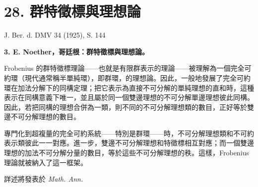\documentclass[11pt]{article}
\begin{document}
\section*{28. 群特徵標與理想論}

\begin{center}
J. Ber. d. DMV 34 (1925), S. 144
\end{center}

\textbf{3. E. Noether，哥廷根：群特徵標與理想論。}

Frobenius 的群特徵標理論——也就是有限群表示的理論——被理解為一個完全可約環（現代通常稱半單純環），即群環，的理想論。因此，一般地發展了完全可約環在加法分解下的同構定理；把它表示為直接不可分解的單純理想的直和時，這種表示在同構意義下唯一，並且屬於同一個雙邊理想的不可分解單邊理想彼此同構。因此，若把同構的理想合併為一類，則不同的不可分解理想類的數目，正好等於雙邊不可分解理想的數目。

專門化到超複量的完全可約系統——特別是群環——時，不可分解理想類和不可約表示類彼此一一對應。進一步，雙邊不可分解理想和特徵標相互對應；而一個雙邊理想的加法不可分解分量的數目，等於這些不可分解理想的秩。這樣，Frobenius 理論就被納入了這一框架。

詳述將發表於 \emph{Math. Ann.}
\end{document}
